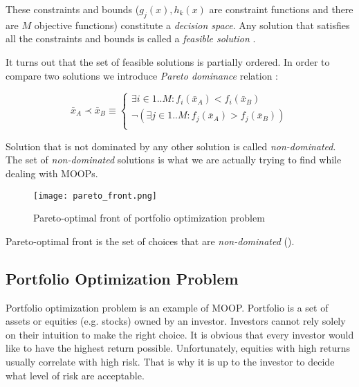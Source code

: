These constraints and bounds ($g_{j}(x) , h_{k}(x) $ are constraint functions and there are $M$ objective functions) constitute a \emph{decision space}. 
\cite{Deb:2001:MOU:559152}
Any solution that satisfies all the constraints and bounds is called a \emph{feasible solution} \cite{Deb:2001:MOU:559152}.

It turns out that the set of feasible solutions is partially ordered.
In order to compare two solutions we introduce \emph{Pareto dominance} relation \cite{Phd}:

\begin{equation}
\bar{x}_{A}  \prec \bar{x}_{B} \equiv
      \begin{cases}
     \exists{i \in 1..M} : f_{i}(\bar{x}_{A}) < f_{i}(\bar{x}_{B}) \\
     \neg (\exists{j \in 1..M} : f_{j}(\bar{x}_{A}) > f_{j}(\bar{x}_{B}))  \\ 
			  
      
\end{cases} 
\end{equation}

Solution that is not dominated by any other solution is called \emph{non-dominated}. 
The set of \emph{non-dominated} solutions is what we are actually trying to find while dealing with MOOPs.



\begin{figure}[H]
  \begin{center}
    \texttt{[image: pareto\_front.png]}
  \end{center}
  \caption{Pareto-optimal front of portfolio optimization problem}
\end{figure}


Pareto-optimal front is the set of choices that are \emph{non-dominated} (\cite{Dre_01}).
 

\subsection{Portfolio Optimization Problem}

Portfolio optimization problem is an example of MOOP.
Portfolio is a set of assets or equities (e.g. stocks) owned by an investor.
Investors cannot rely solely on their intuition to make the right choice.
It is obvious that every investor would like to have the highest return possible.
Unfortunately, equities with high returns usually correlate with high risk. 
That is why it is up to the investor to decide what level of risk are acceptable.

